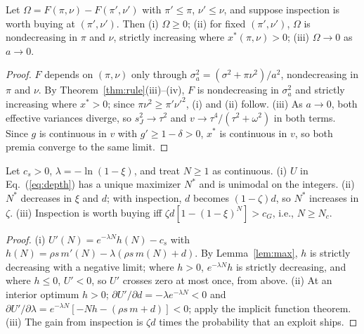 \documentclass[acmsmall,screen,review]{acmart}
\theoremstyle{acmdefinition}
\begin{document}
\begin{corollary}\label{cor:omega}
Let $\Omega = F(\pi,\nu) - F(\pi',\nu')$ with $\pi' \le \pi$, $\nu' \le \nu$, and suppose inspection is worth buying at $(\pi',\nu')$. Then (i) $\Omega \ge 0$; (ii) for fixed $(\pi',\nu')$, $\Omega$ is nondecreasing in $\pi$ and $\nu$, strictly increasing where $x^*(\pi,\nu) > 0$; (iii) $\Omega \to 0$ as $a \to 0$.
\end{corollary}
\begin{proof}
$F$ depends on $(\pi,\nu)$ only through $\sigma_a^2 = (\sigma^2 + \pi\nu^2)/a^2$, nondecreasing in $\pi$ and $\nu$. By Theorem~\ref{thm:rule}(iii)--(iv), $F$ is nondecreasing in $\sigma_a^2$ and strictly increasing where $x^* > 0$; since $\pi\nu^2 \ge \pi'\nu'^2$, (i) and (ii) follow. (iii) As $a \to 0$, both effective variances diverge, so $s_J^2 \to \tau^2$ and $v \to \tau^4/(\tau^2+\omega^2)$ in both terms. Since $g$ is continuous in $v$ with $g' \ge 1 - \delta > 0$, $x^*$ is continuous in $v$, so both premia converge to the same limit.
\end{proof}

\begin{theorem}\label{thm:depth}
Let $c_s > 0$, $\lambda = -\ln(1-\xi)$, and treat $N \ge 1$ as continuous. (i) $U$ in Eq.~(\ref{eq:depth}) has a unique maximizer $N^*$ and is unimodal on the integers. (ii) $N^*$ decreases in $\xi$ and $d$; with inspection, $d$ becomes $(1-\zeta)d$, so $N^*$ increases in $\zeta$. (iii) Inspection is worth buying iff $\zeta d[1-(1-\xi)^N] > c_G$, i.e., $N \ge N_c$.
\end{theorem}
\begin{proof}
(i) $U'(N) = e^{-\lambda N}h(N) - c_s$ with $h(N) = \rho s\,m'(N) - \lambda(\rho s\,m(N) + d)$. By Lemma~\ref{lem:max}, $h$ is strictly decreasing with a negative limit; where $h > 0$, $e^{-\lambda N}h$ is strictly decreasing, and where $h \le 0$, $U' < 0$, so $U'$ crosses zero at most once, from above. (ii) At an interior optimum $h > 0$; $\partial U'/\partial d = -\lambda e^{-\lambda N} < 0$ and $\partial U'/\partial\lambda = e^{-\lambda N}[-Nh - (\rho s\,m + d)] < 0$; apply the implicit function theorem. (iii) The gain from inspection is $\zeta d$ times the probability that an exploit ships.
\end{proof}
\end{document}
